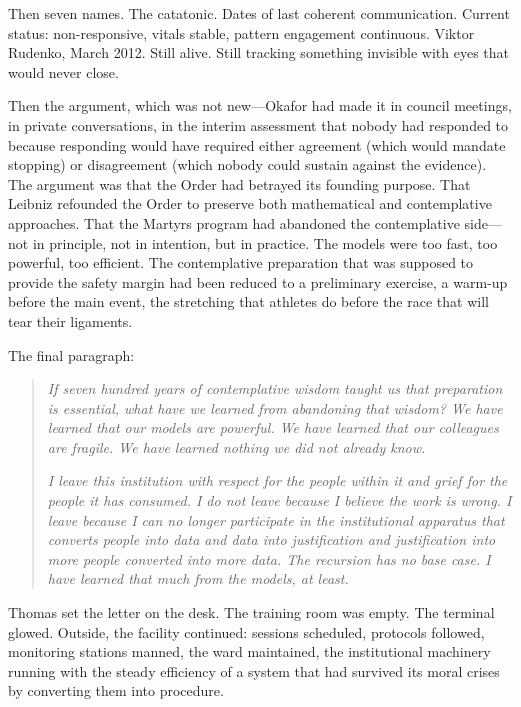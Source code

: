 Then seven names. The catatonic. Dates of last coherent communication. Current status: non-responsive, vitals stable, pattern engagement continuous. Viktor Rudenko, March 2012. Still alive. Still tracking something invisible with eyes that would never close.

Then the argument, which was not new---Okafor had made it in council meetings, in private conversations, in the interim assessment that nobody had responded to because responding would have required either agreement (which would mandate stopping) or disagreement (which nobody could sustain against the evidence). The argument was that the Order had betrayed its founding purpose. That Leibniz refounded the Order to preserve both mathematical and contemplative approaches. That the Martyrs program had abandoned the contemplative side---not in principle, not in intention, but in practice. The models were too fast, too powerful, too efficient. The contemplative preparation that was supposed to provide the safety margin had been reduced to a preliminary exercise, a warm-up before the main event, the stretching that athletes do before the race that will tear their ligaments.

The final paragraph:

\begin{quote}
\textit{If seven hundred years of contemplative wisdom taught us that preparation is essential, what have we learned from abandoning that wisdom? We have learned that our models are powerful. We have learned that our colleagues are fragile. We have learned nothing we did not already know.}

\textit{I leave this institution with respect for the people within it and grief for the people it has consumed. I do not leave because I believe the work is wrong. I leave because I can no longer participate in the institutional apparatus that converts people into data and data into justification and justification into more people converted into more data. The recursion has no base case. I have learned that much from the models, at least.}
\end{quote}

Thomas set the letter on the desk. The training room was empty. The terminal glowed. Outside, the facility continued: sessions scheduled, protocols followed, monitoring stations manned, the ward maintained, the institutional machinery running with the steady efficiency of a system that had survived its moral crises by converting them into procedure.

